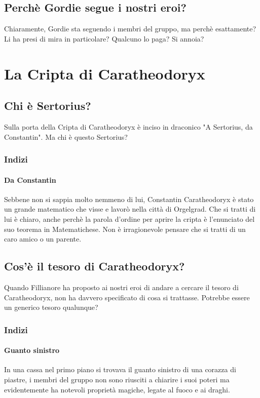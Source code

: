 \documentclass[letterpaper,twocolumn,openany,nodeprecatedcode]{dndbook}
\begin{document}
\subsection{Perchè Gordie segue i nostri eroi?}
Chiaramente, Gordie sta seguendo i membri del gruppo, ma perchè esattamente? Li ha presi di mira in particolare? Qualcuno lo paga? Si annoia?

\section{La Cripta di Caratheodoryx}

\subsection{Chi è Sertorius?}
Sulla porta della Cripta di Caratheodoryx è inciso in draconico "A Sertorius, da Constantin". Ma chi è questo Sertorius?

\subsubsection{Indizi}
\paragraph{Da Constantin} Sebbene non si sappia molto nemmeno di lui, Constantin Caratheodoryx è stato un grande matematico che visse e lavorò nella città di Orgelgrad. Che si tratti di lui è chiaro, anche perchè la parola d'ordine per aprire la cripta è l'enunciato del suo teorema in Matematichese. Non è irragionevole pensare che si tratti di un caro amico o un parente.

\subsection{Cos'è il tesoro di Caratheodoryx?}
Quando Fillianore ha proposto ai nostri eroi di andare a cercare il tesoro di Caratheodoryx, non ha davvero specificato di cosa si trattasse. Potrebbe essere un generico tesoro qualunque?

\subsubsection{Indizi}
\paragraph{Guanto sinistro} In una cassa nel primo piano si trovava il guanto sinistro di una corazza di piastre, i membri del gruppo non sono riusciti a chiarire i suoi poteri ma evidentemente ha notevoli proprietà magiche, legate al fuoco e ai draghi.
\end{document}
